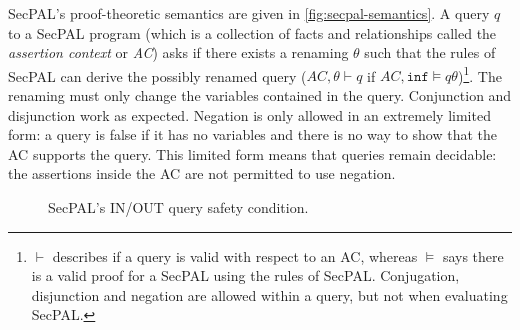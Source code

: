 \documentclass[thesis.tex]{subfiles}
\begin{document}
SecPAL's proof-theoretic semantics are given in \autoref{fig:secpal-semantics}.  A
query $q$ to a SecPAL program (which is a collection of facts and
relationships called the \emph{assertion context} or \emph{AC}) asks
if there exists a renaming $\theta$ such that the rules of SecPAL can
derive the possibly renamed query ($AC,\theta \vdash q$
if $AC,\texttt{inf} \models q\theta$)\footnote{$\vdash$ describes if a query
  is valid with respect to an AC, whereas $\models$ says there is a
  valid proof for a SecPAL using the rules of SecPAL.  Conjugation,
  disjunction and negation are allowed within a query, but not when
  evaluating SecPAL.}.  The renaming must only change 
the variables contained in the query. Conjunction and disjunction work
as expected.  Negation is only allowed in an extremely limited form: a
query is false if it has no variables and there is no way
to show that the AC supports the query.  This limited form means that
queries remain decidable: the assertions inside the AC are not permitted to
use negation. 

\begin{figure}
  \centering\footnotesize
  \caption{SecPAL's IN/OUT query safety condition.}
  \label{fig:safety-conditions}
\end{figure}
 
\end{document}
